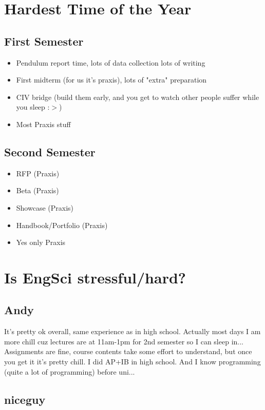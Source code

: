 \section{Hardest Time of the Year}

\subsection{First Semester}
\begin{itemize}
    \item Pendulum report time, lots of data collection lots of writing
    \item First midterm (for us it's praxis), lots of "extra" preparation
    \item CIV bridge (build them early, and you get to watch other people suffer while you sleep :$>$)
    \item Most Praxis stuff
\end{itemize}

\subsection{Second Semester}
\begin{itemize}
    \item RFP (Praxis)
    \item Beta (Praxis)
    \item Showcase (Praxis)
    \item Handbook/Portfolio (Praxis)
    \item Yes only Praxis
\end{itemize}

\section{Is EngSci stressful/hard?}

\subsection{Andy}

It's pretty ok overall, same experience as in high school. Actually most days I am more chill cuz lectures are at 11am-1pm for 2nd semester so I can sleep in... Assignments are fine, course contents take some effort to understand, but once you get it it's pretty chill. I did AP+IB in high school. And I know programming (quite a lot of programming) before uni...

\subsection{niceguy}

